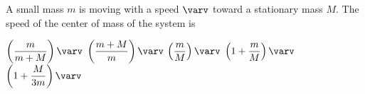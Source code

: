 \documentclass{../../oss-apphys-exam}
\begin{document}
\begin{multicols*}{2}
\begin{questions}

    \question A small mass $m$ is moving with a speed $\varv$ toward a
    stationary mass $M$. The speed of the center of mass of the system is
    \begin{choices}
      \choice $\left(\dfrac m{m+M}\right)\varv$
      \choice $\left(\dfrac{m+M} m\right)\varv$
      \choice $\left(\dfrac mM\right)\varv$
      \choice $\left(1+\dfrac mM\right)\varv$
      \choice $\left(1+\dfrac M{3m}\right)\varv$
    \end{choices}


\end{questions}
\end{multicols*}
\end{document}
